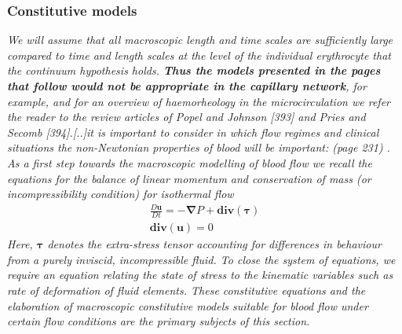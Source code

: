 \documentclass[11pt,letterpaper]{article}
\begin{document}
\subsubsection*{Constitutive models}
\textit{We will assume that all macroscopic length and time scales are sufficiently large compared to time and length scales at the level of the individual erythrocyte that the continuum hypothesis holds. \textbf{Thus the models presented in the pages that follow would not be appropriate in the capillary network}, for example, and for an overview of haemorheology in the microcirculation we refer the reader to the review articles of Popel and Johnson [393] and Pries and Secomb [394].[..]\newline it is important to consider in which flow regimes and clinical situations the non-Newtonian properties of blood will be important: (page 231) \newline {}. }\newline\newline
\textit{As a first step towards the macroscopic modelling of blood flow we recall the equations for the balance of linear momentum and conservation of mass (or incompressibility condition) for isothermal flow}
\begin{align}
    \frac{D \bm{u}}{D t} = -\bm{\nabla}P + \bm{div}(\bm{\tau})  \\
    \bm{div}(\bm{u}) = 0
\end{align}
\textit{Here, $\bm{\tau}$ denotes the extra-stress tensor accounting for differences in behaviour from a purely inviscid, incompressible fluid. To close the system of equations, we require an equation relating the state of stress to the kinematic variables such as rate of deformation of fluid elements. These constitutive equations and the elaboration of macroscopic constitutive models suitable for blood flow under certain flow conditions are the primary subjects of this section.}
\end{document}
